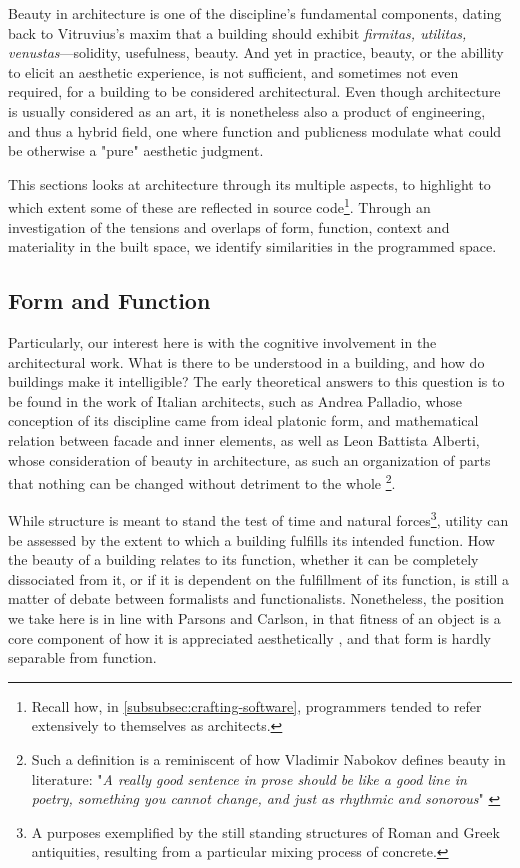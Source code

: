 Beauty in architecture is one of the discipline's fundamental components, dating back to Vitruvius's maxim that a building should exhibit \emph{firmitas, utilitas, venustas}—solidity, usefulness, beauty. And yet in practice, beauty, or the abillity to elicit an aesthetic experience, is not sufficient, and sometimes not even required, for a building to be considered architectural. Even though architecture is usually considered as an art, it is nonetheless also a product of engineering, and thus a hybrid field, one where function and publicness modulate what could be otherwise a "pure" aesthetic judgment.

This sections looks at architecture through its multiple aspects, to highlight to which extent some of these are reflected in source code\footnote{Recall how, in \ref{subsubsec:crafting-software}, programmers tended to refer extensively to themselves as architects.}. Through an investigation of the tensions and overlaps of form, function, context and materiality in the built space, we identify similarities in the programmed space.

\subsection{Form and Function}
\label{subsec:form-function}

Particularly, our interest here is with the cognitive involvement in the architectural work. What is there to be understood in a building, and how do buildings make it intelligible? The early theoretical answers to this question is to be found in the work of Italian architects, such as Andrea Palladio, whose conception of its discipline came from ideal platonic form, and mathematical relation between facade and inner elements, as well as Leon Battista Alberti, whose consideration of beauty in architecture, as such an organization of parts that nothing can be changed without detriment to the whole \citep{scruton_aesthetics_2013}\footnote{Such a definition is a reminiscent of how Vladimir Nabokov defines beauty in literature: "\emph{A really good sentence in prose should be like a good line in poetry, something you cannot change, and just as rhythmic and sonorous}" \citep{nabokov_lectures_1980}}.

While structure is meant to stand the test of time and natural forces\footnote{A purposes exemplified by the still standing structures of Roman and Greek antiquities, resulting from a particular mixing process of concrete.}, utility can be assessed by the extent to which a building fulfills its intended function. How the beauty of a building relates to its function, whether it can be completely dissociated from it, or if it is dependent on the fulfillment of its function, is still a matter of debate between formalists and functionalists. Nonetheless, the position we take here is in line with Parsons and Carlson, in that fitness of an object is a core component of how it is appreciated aesthetically \citep{parsons_functional_2012}, and that form is hardly separable from function.

